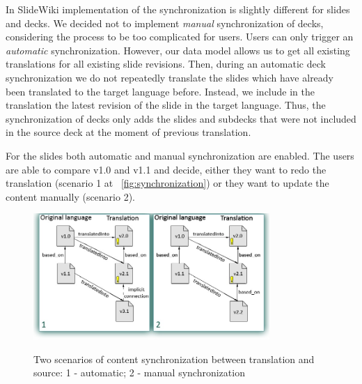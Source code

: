 \documentclass[ngerman,UKenglish,table]{scrbook}
\begin{document}
In SlideWiki implementation of the synchronization is slightly different for slides and decks. 
We decided not to implement \emph{manual} synchronization of decks, considering the process to be too complicated for users.
Users can only trigger an \emph{automatic} synchronization.
However, our  data model allows us to get all existing translations for all existing slide revisions.
Then, during an automatic deck synchronization we do not repeatedly translate the slides which have already been translated to the target language before.
Instead, we include in the translation the latest revision of the slide in the target language.
Thus, the synchronization of decks only adds the slides and subdecks that were not included in the source deck at the moment of previous translation.

For the slides both automatic and manual synchronization are enabled.
The users are able to compare v1.0 and v1.1 and decide, either they want to redo the translation (scenario 1 at ~\autoref{fig:synchronization}) or they want to update the content manually (scenario 2).

\begin{figure}[!ht]
\centering
\includegraphics[width=0.8\textwidth]{Images/translation-logic.jpg}\\
\caption{Two scenarios of content synchronization between translation and source: 1 - automatic; 2 - manual synchronization}
\label{fig:synchronization}
\end{figure}
\end{document}

